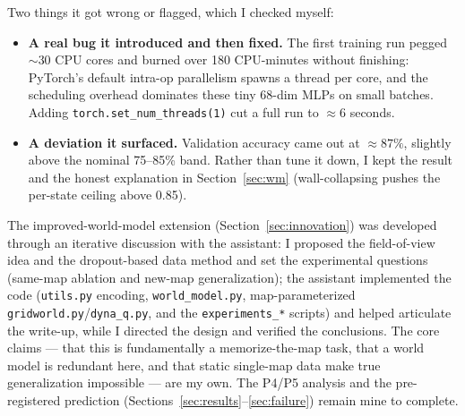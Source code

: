 \documentclass[11pt]{article}
\begin{document}
Two things it got wrong or flagged, which I checked myself:
\begin{itemize}
  \item \textbf{A real bug it introduced and then fixed.} The first training run
  pegged $\sim$30 CPU cores and burned over 180 CPU-minutes without finishing:
  PyTorch's default intra-op parallelism spawns a thread per core, and the
  scheduling overhead dominates these tiny $68$-dim MLPs on small batches. Adding
  \texttt{torch.set\_num\_threads(1)} cut a full run to $\approx 6$ seconds.
  \item \textbf{A deviation it surfaced.} Validation accuracy came out at
  $\approx 87\%$, slightly above the nominal 75--85\% band. Rather than tune it
  down, I kept the result and the honest explanation in Section~\ref{sec:wm}
  (wall-collapsing pushes the per-state ceiling above 0.85).
\end{itemize}

The improved-world-model extension (Section~\ref{sec:innovation}) was developed
through an iterative discussion with the assistant: I proposed the
field-of-view idea and the dropout-based data method and set the experimental
questions (same-map ablation and new-map generalization); the assistant
implemented the code (\texttt{utils.py} encoding, \texttt{world\_model.py},
map-parameterized \texttt{gridworld.py}/\texttt{dyna\_q.py}, and the
\texttt{experiments\_*} scripts) and helped articulate the write-up, while I
directed the design and verified the conclusions. The core claims --- that this
is fundamentally a memorize-the-map task, that a world model is redundant here,
and that static single-map data make true generalization impossible --- are my
own. The P4/P5 analysis and the pre-registered prediction
(Sections~\ref{sec:results}--\ref{sec:failure}) remain mine to complete.
\end{document}
